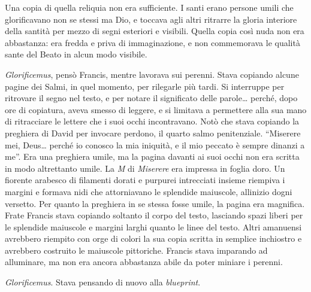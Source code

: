 Una copia di quella reliquia non era sufficiente. I santi erano persone
umili che glorificavano non se stessi ma Dio, e toccava agli altri
ritrarre la gloria interiore della santità per mezzo di segni esteriori
e visibili. Quella copia così nuda non era abbastanza: era fredda e
priva di immaginazione, e non commemorava le qualità sante del Beato in
alcun modo visibile.

\emph{Glorificemus}, pensò Francis, mentre lavorava sui perenni. Stava
copiando alcune pagine dei Salmi, in quel momento, per rilegarle più
tardi. Si interruppe per ritrovare il segno nel testo, e per notare il
significato delle parole\ldots{} perché, dopo ore di copiatura, aveva
smesso di leggere, e si limitava a permettere alla sua mano di
ritracciare le lettere che i suoi occhi incontravano. Notò che stava
copiando la preghiera di David per invocare perdono, il quarto salmo
penitenziale. ``Miserere mei, Deus\ldots{} perché io conosco la mia
iniquità, e il mio peccato è sempre dinanzi a me''. Era una preghiera
umile, ma la pagina davanti ai suoi occhi non era scritta in modo
altrettanto umile. La \emph{M} di \emph{Miserere} era impressa in foglia
d\textquotesingle oro. Un fiorente arabesco di filamenti dorati e
purpurei intrecciati insieme riempiva i margini e formava nidi che
attorniavano le splendide maiuscole, all\textquotesingle inizio
d\textquotesingle ogni versetto. Per quanto la preghiera in se stessa
fosse umile, la pagina era magnifica. Frate Francis stava copiando
soltanto il corpo del testo, lasciando spazi liberi per le splendide
maiuscole e margini larghi quanto le linee del testo. Altri amanuensi
avrebbero riempito con orge di colori la sua copia scritta in semplice
inchiostro e avrebbero costruito le maiuscole pittoriche. Francis stava
imparando ad alluminare, ma non era ancora abbastanza abile da poter
miniare i perenni.

\emph{Glorificemus}. Stava pensando di nuovo alla \emph{blueprint}.

